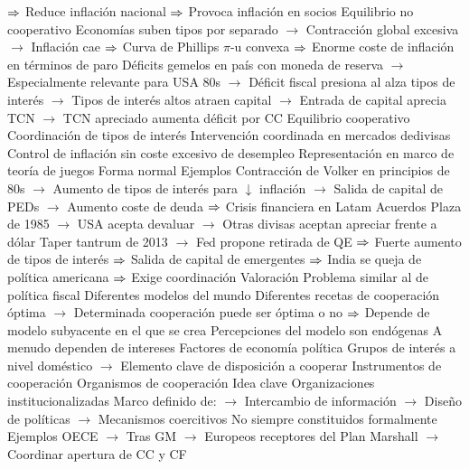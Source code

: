 \documentclass{nuevotema}
\begin{document}
\begin{esquemal}
				\4[] $\Rightarrow$ Reduce inflación nacional
				\4[] $\Rightarrow$ Provoca inflación en socios
				\4 Equilibrio no cooperativo
				\4[] Economías suben tipos por separado
				\4[] $\to$ Contracción global excesiva
				\4[] $\to$ Inflación cae
				\4[] $\Rightarrow$ Curva de Phillips $\pi$-u convexa
				\4[] $\Rightarrow$ Enorme coste de inflación en términos de paro
				\4[] Déficits gemelos en país con moneda de reserva
				\4[] $\to$ Especialmente relevante para USA 80s
				\4[] $\to$ Déficit fiscal presiona al alza tipos de interés
				\4[] $\to$ Tipos de interés altos atraen capital
				\4[] $\to$ Entrada de capital aprecia TCN
				\4[] $\to$ TCN apreciado aumenta déficit por CC
				\4 Equilibrio cooperativo
				\4[] Coordinación de tipos de interés
				\4[] Intervención coordinada en mercados dedivisas
				\4[] Control de inflación sin coste excesivo de desempleo
				\4 Representación en marco de teoría de juegos
				\4[] Forma normal
				\4[] 
				\4 Ejemplos
				\4[] Contracción de Volker en principios de 80s
				\4[] $\to$ Aumento de tipos de interés para $\downarrow$ inflación
				\4[] $\to$ Salida de capital de PEDs
				\4[] $\to$ Aumento coste de deuda
				\4[] $\Rightarrow$ Crisis financiera en Latam
				\4[] Acuerdos Plaza de 1985
				\4[] $\to$ USA acepta devaluar
				\4[] $\to$ Otras divisas aceptan apreciar frente a dólar
				\4[] Taper tantrum de 2013
				\4[] $\to$ Fed propone retirada de QE
				\4[] $\Rightarrow$ Fuerte aumento de tipos de interés
				\4[] $\Rightarrow$ Salida de capital de emergentes
				\4[] $\Rightarrow$ India se queja de política americana
				\4[] $\Rightarrow$ Exige coordinación
			\3 Valoración
				\4 Problema similar al de política fiscal
				\4 Diferentes modelos del mundo
				\4[] Diferentes recetas de cooperación óptima
				\4[] $\to$ Determinada cooperación puede ser óptima o no
				\4[] $\Rightarrow$ Depende de modelo subyacente en el que se crea
				\4 Percepciones del modelo son endógenas
				\4[] A menudo dependen de intereses
				\4 Factores de economía política
				\4[] Grupos de interés a nivel doméstico
				\4[] $\to$ Elemento clave de disposición a cooperar
		\2 Instrumentos de cooperación
			\3 Organismos de cooperación
				\4 Idea clave
				\4[] Organizaciones institucionalizadas
				\4[] Marco definido de:
				\4[] $\to$ Intercambio de información
				\4[] $\to$ Diseño de políticas
				\4[] $\to$ Mecanismos coercitivos
				\4[] No siempre constituidos formalmente
				\4 Ejemplos
				\4[] OECE
				\4[] $\to$ Tras GM
				\4[] $\to$ Europeos receptores del Plan Marshall
				\4[] $\to$ Coordinar apertura de CC y CF

\end{esquemal}
\end{document}
